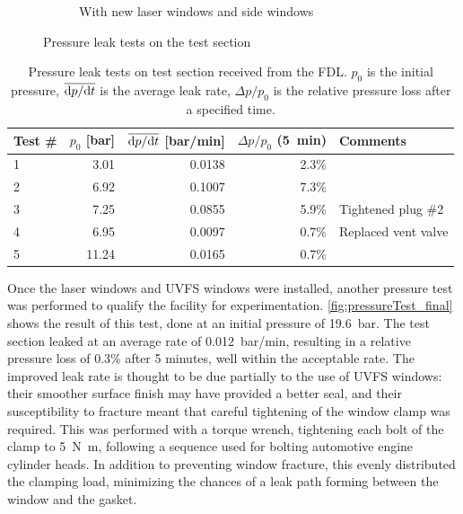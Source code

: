 \begin{figure}[h]
\begin{subfigure}[t]{0.47\textwidth}
                    \caption{With new laser windows and side windows}
                    \label{fig:pressureTest_final}
                \end{subfigure}
                \caption{Pressure leak tests on the test section}
                \label{fig:pressureTest}
            \end{figure}

            \begin{table}[h]
                \centering
                \caption[Pressure leak tests on test section]{Pressure leak tests on test section received from the FDL. $p_0$ is the initial pressure, $\overline{\mathrm{d}p/\mathrm{d}t}$ is the average leak rate, $\Delta p/p_0$ is the relative pressure loss after a specified time.}
                \label{tab:pressureTests_og}
                \begin{tabular}{lrrrl}
                    \toprule
                    Test \#  & $p_0$ [bar]  & $\overline{\mathrm{d}p/\mathrm{d}t}$ [bar/min]   & $\Delta p/p_0$ (5~min) & Comments \\
                    \midrule
                    1   & 3.01  & 0.0138    & 2.3\%    &   \\
                    2   & 6.92  & 0.1007    & 7.3\%    &   \\
                    3   & 7.25  & 0.0855    & 5.9\%    & Tightened plug \#2  \\
                    4   & 6.95  & 0.0097    & 0.7\%    & Replaced vent valve  \\
                    5   & 11.24 & 0.0165    & 0.7\%    &   \\
                    \bottomrule
                \end{tabular}
            \end{table}

            Once the laser windows and UVFS windows were installed, another pressure test was performed to qualify the facility for experimentation. \autoref{fig:pressureTest_final} shows the result of this test, done at an initial pressure of \qty{19.6}{bar}. The test section leaked at an average rate of \qty{0.012}{bar/min}, resulting in a relative pressure loss of 0.3\% after 5 minutes, well within the acceptable rate. The improved leak rate is thought to be due partially to the use of UVFS windows: their smoother surface finish may have provided a better seal, and their susceptibility to fracture meant that careful tightening of the window clamp was required. This was performed with a torque wrench, tightening each bolt of the clamp to \qty{5}{N.m}, following a sequence used for bolting automotive engine cylinder heads. In addition to preventing window fracture, this evenly distributed the clamping load, minimizing the chances of a leak path forming between the window and the gasket.

